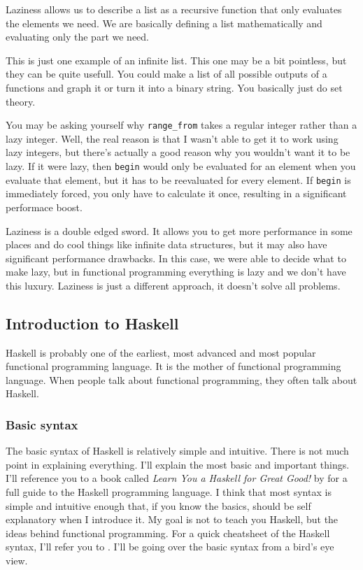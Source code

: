 \documentclass[11pt]{article}
\begin{document}
Laziness allows us to describe a list as a recursive function that only
evaluates the elements we need. We are basically defining a list mathematically
and evaluating only the part we need.

This is just one example of an infinite list. This one may be a bit pointless,
but they can be quite usefull. You could make a list of all possible outputs of
a functions and graph it or turn it into a binary string. You basically just do
set theory.


You may be asking yourself why \texttt{range\_from} takes a regular integer
rather than a lazy integer. Well, the real reason is that I wasn't able to get
it to work using lazy integers, but there's actually a good reason why you
wouldn't want it to be lazy. If it were lazy, then \texttt{begin} would only be
evaluated for an element when you evaluate that element, but it has to be
reevaluated for every element. If \texttt{begin} is immediately forced, you
only have to calculate it once, resulting in a significant performace boost.

Laziness is a double edged sword. It allows you to get more performance in some
places and do cool things like infinite data structures, but it may also have
significant performance drawbacks. In this case, we were able to decide what to
make lazy, but in functional programming everything is lazy and we don't have
this luxury. Laziness is just a different approach, it doesn't solve all
problems.


\subsection{Introduction to Haskell}

Haskell is probably one of the earliest, most advanced and most popular
functional programming language. It is the mother of functional programming
language. When people talk about functional programming, they often talk about
Haskell.

\subsubsection{Basic syntax}\label{syntax}

The basic syntax of Haskell is relatively simple and intuitive. There is not
much point in explaining everything. I'll explain the most basic and important
things. I'll reference you to a book called \emph{Learn You a Haskell for Great
Good!} by \textcite{miran2011} for a full guide to the Haskell programming
language. I think that most syntax is simple and intuitive enough that, if you
know the basics, should be self explanatory when I introduce it. My goal is not
to teach you Haskell, but the ideas behind functional programming. For a quick
cheatsheet of the Haskell syntax, I'll refer you to \parencite{haskell}. I'll
be going over the basic syntax from a bird's eye view.
\end{document}

